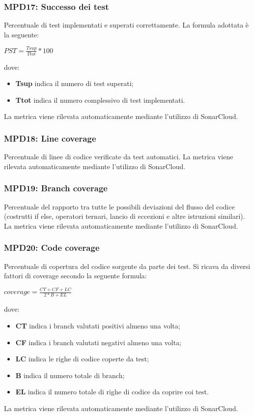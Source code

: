 \subsubsection{MPD17: Successo dei test}
Percentuale di test implementati e superati correttamente.
La formula adottata è la seguente:
\begin{center}
    $PST = \displaystyle \frac{Tsup}{Ttot}*100$
\end{center}
dove:
\begin{itemize}
    \item \textbf{Tsup} indica il numero di test superati;
    \item \textbf{Ttot} indica il numero complessivo di test implementati.
\end{itemize}
La metrica viene rilevata automaticamente mediante l’utilizzo di {SonarCloud}\glo.

\subsubsection{MPD18: Line coverage}
Percentuale di linee di codice verificate da test automatici.
La metrica viene rilevata automaticamente mediante l’utilizzo di {SonarCloud}\glo.

\subsubsection{MPD19: Branch coverage}
Percentuale del rapporto tra tutte le possibili deviazioni del flusso del codice (costrutti if else, operatori ternari, lancio di eccezioni e altre istruzioni similari).
La metrica viene rilevata automaticamente mediante l’utilizzo di {SonarCloud}\glo.

\subsubsection{MPD20: Code coverage}
Percentuale di copertura del codice sorgente da parte dei test. Si ricava da diversi fattori di coverage secondo la seguente formula:
\begin{center}
    $coverage = \displaystyle \frac{CT + CF + LC}{2 * B + EL}$
\end{center}
dove:
\begin{itemize}
    \item \textbf{CT} indica i branch valutati positivi almeno una volta;
    \item \textbf{CF} indica i branch valutati negativi almeno una volta;
    \item \textbf{LC} indica le righe di codice coperte da test;
    \item \textbf{B} indica il numero totale di branch;
    \item \textbf{EL} indica il numero totale di righe di codice da coprire coi test.
\end{itemize}
La metrica viene rilevata automaticamente mediante l’utilizzo di {SonarCloud}\glo.
